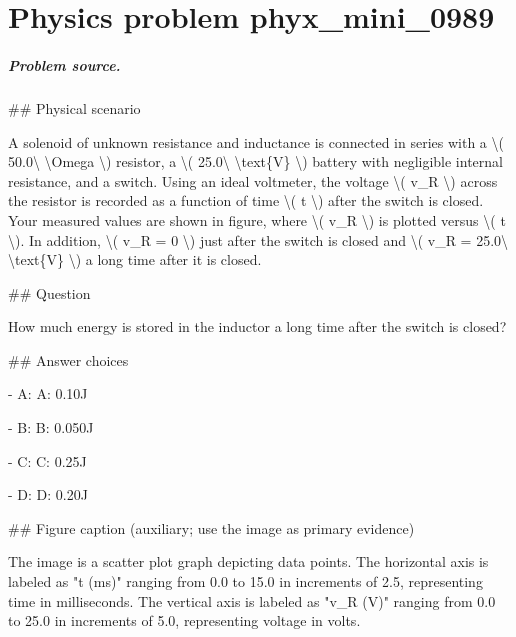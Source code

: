 
\chapter{Physics problem phyx\_mini\_0989}
\label{ch:PhyXMiniProblems_problem_phyx_mini_0989}

\paragraph{Problem source.}
\#\# Physical scenario

A solenoid of unknown resistance and inductance is connected in series with a \textbackslash{}( 50.0\textbackslash{} \textbackslash{}Omega \textbackslash{}) resistor, a \textbackslash{}( 25.0\textbackslash{} \textbackslash{}text\{V\} \textbackslash{}) battery with negligible internal resistance, and a switch. Using an ideal voltmeter, the voltage \textbackslash{}( v\_R \textbackslash{}) across the resistor is recorded as a function of time \textbackslash{}( t \textbackslash{}) after the switch is closed. Your measured values are shown in figure, where \textbackslash{}( v\_R \textbackslash{}) is plotted versus \textbackslash{}( t \textbackslash{}). In addition, \textbackslash{}( v\_R = 0 \textbackslash{}) just after the switch is closed and \textbackslash{}( v\_R = 25.0\textbackslash{} \textbackslash{}text\{V\} \textbackslash{}) a long time after it is closed.

\#\# Question

How much energy is stored in the inductor a long time after the switch is closed?

\#\# Answer choices

- A: A: 0.10J

- B: B: 0.050J

- C: C: 0.25J

- D: D: 0.20J

\#\# Figure caption (auxiliary; use the image as primary evidence)

The image is a scatter plot graph depicting data points. The horizontal axis is labeled as "t (ms)" ranging from 0.0 to 15.0 in increments of 2.5, representing time in milliseconds. The vertical axis is labeled as "v\_R (V)" ranging from 0.0 to 25.0 in increments of 5.0, representing voltage in volts.

